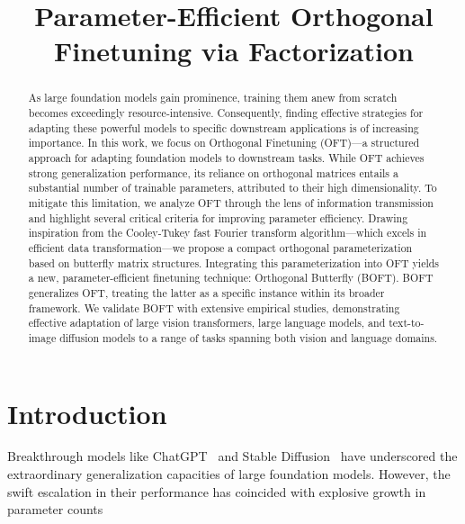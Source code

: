 \title{Parameter-Efficient Orthogonal Finetuning via Factorization}

\begin{abstract}
As large foundation models gain prominence, training them anew from scratch becomes exceedingly resource-intensive. Consequently, finding effective strategies for adapting these powerful models to specific downstream applications is of increasing importance. In this work, we focus on Orthogonal Finetuning (OFT)—a structured approach for adapting foundation models to downstream tasks. While OFT achieves strong generalization performance, its reliance on orthogonal matrices entails a substantial number of trainable parameters, attributed to their high dimensionality. To mitigate this limitation, we analyze OFT through the lens of information transmission and highlight several critical criteria for improving parameter efficiency. Drawing inspiration from the Cooley-Tukey fast Fourier transform algorithm—which excels in efficient data transformation—we propose a compact orthogonal parameterization based on butterfly matrix structures. Integrating this parameterization into OFT yields a new, parameter-efficient finetuning technique: Orthogonal Butterfly (BOFT). BOFT generalizes OFT, treating the latter as a specific instance within its broader framework. We validate BOFT with extensive empirical studies, demonstrating effective adaptation of large vision transformers, large language models, and text-to-image diffusion models to a range of tasks spanning both vision and language domains.
\end{abstract}

\section{Introduction}

Breakthrough models like ChatGPT~\cite{brown2020language,chen2021evaluating} and Stable Diffusion~\cite{rombach2022high} have underscored the extraordinary generalization capacities of large foundation models. However, the swift escalation in their performance has coincided with explosive growth in parameter counts 

